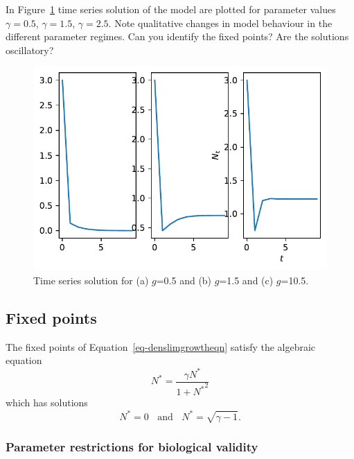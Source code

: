 \documentclass[
  letterpaper,
  DIV=11,
  numbers=noendperiod]{scrreprt}
\begin{document}
In Figure~\ref{fig-plotdensmodel1} time series solution of the model are
plotted for parameter values \(\gamma=0.5\), \(\gamma=1.5\),
\(\gamma=2.5\). Note qualitative changes in model behaviour in the
different parameter regimes. Can you identify the fixed points? Are the
solutions oscillatory?

\begin{figure}

{\centering \includegraphics{MA32009-SinglePopDiscreteTimea_files/figure-pdf/fig-plotdensmodel1-output-1.pdf}

}

\caption{\label{fig-plotdensmodel1}Time series solution for (a)
\(g\)=0.5 and (b) \(g\)=1.5 and (c) \(g\)=10.5.}

\end{figure}

\hypertarget{fixed-points-1}{%
\subsection{Fixed points}\label{fixed-points-1}}

The fixed points of Equation~\ref{eq-denslimgrowtheqn} satisfy the
algebraic equation \[
N^*=\frac{\gamma N^*}{1+{N^*}^2}
\] which has solutions \[
N^* = 0  \ \ \ \ \textrm{and} \ \ \ \ N^*=\sqrt{\gamma-1}.
\]

\hypertarget{parameter-restrictions-for-biological-validity}{%
\subsubsection{Parameter restrictions for biological
validity}\label{parameter-restrictions-for-biological-validity}}
\end{document}

